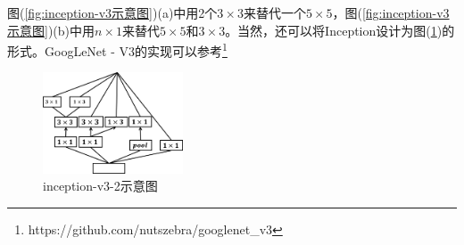             图(\ref{fig:inception-v3示意图})(a)中用2个$3\times 3$来替代一个$5\times 5$，图(\ref{fig:inception-v3示意图})(b)中用$n\times 1$来替代$5\times 5$和$3\times 3$。当然，还可以将Inception设计为图(\ref{fig:inception-v3-2示意图})的形式。GoogLeNet - V3的实现可以参考\footnote{https://github.com/nutszebra/googlenet\_v3}
             \begin{figure}[H]
            \centering
            \includegraphics[height=3cm]{images/inception_v3_2.jpg}
            \caption{inception-v3-2示意图}
            \label{fig:inception-v3-2示意图}
            \end{figure}



